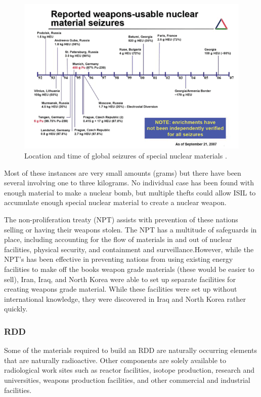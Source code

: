 \documentclass{report}
\begin{document}
\begin{figure}[h]
 \centering
 \includegraphics[trim = 0cm 0cm 0cm 0cm, clip,scale=0.7]{./figures/seizures.png}
   \caption{Location and time of global seizures of special nuclear materials \cite{Muller2007}.}
     \label{fig:seizures}
\end{figure}


Most of these instances are very small amounts (grams) but there have been several involving one to three kilograms. No individual case has been found with enough material to make a nuclear bomb, but multiple thefts could allow ISIL to accumulate enough special nuclear material to create a nuclear weapon. 

The non-proliferation treaty (NPT) assists with prevention of these nations selling or having their weapons stolen. The NPT has a multitude of safeguards in place, including accounting for the flow of materials in and out of nuclear facilities, physical security, and containment and surveillance.However, while the NPT's has been effective in preventing nations from using existing energy facilities to make off the books weapon grade materials (these would be easier to sell), Iran, Iraq, and North Korea were able to set up separate facilities for creating weapons grade material. While these facilities were set up without international knowledge, they were discovered in Iraq and North Korea rather quickly.


\subsubsection{RDD}
 Some of the materials required to build an RDD are naturally occurring elements that are naturally radioactive. Other components are solely available to radiological work sites such as reactor facilities, isotope production, research and universities, weapons production facilities, and other commercial and industrial facilities. 
\end{document}
